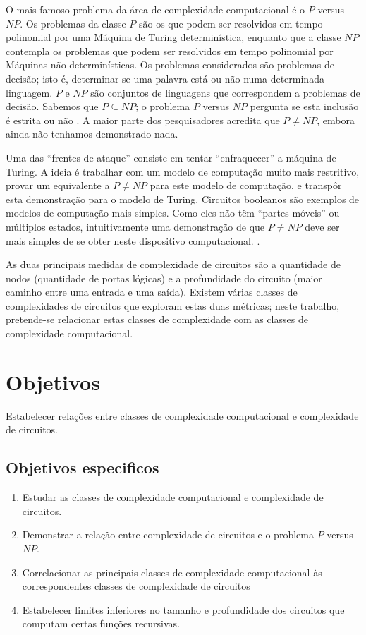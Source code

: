 \documentclass[12pt]{article}
\begin{document}
    O mais famoso problema da área de complexidade computacional é o $P$ versus $NP$.
    Os problemas da classe $P$ são os que podem ser resolvidos em tempo polinomial
    por uma Máquina de Turing determinística, enquanto que a classe $NP$ contempla
    os problemas que podem ser resolvidos em tempo polinomial por Máquinas
    não-determinísticas.
    Os problemas considerados são problemas de decisão; isto é, determinar se uma
    palavra está ou não numa determinada linguagem. $P$ e $NP$ são conjuntos de
    linguagens que correspondem a problemas de decisão. Sabemos que $P \subseteq NP$;
    o problema $P$ versus $NP$ pergunta se esta inclusão é estrita ou não \cite{Sipser2006}.
    A maior parte dos pesquisadores acredita que $P \neq NP$,
    embora ainda não tenhamos demonstrado nada.

    Uma das ``frentes de ataque'' consiste em tentar ``enfraquecer'' a máquina de Turing.
    A ideia é trabalhar com um modelo de computação muito mais restritivo,
    provar um equivalente a $P \neq NP$ para este modelo de computação,
    e transpôr esta demonstração para o modelo de Turing.
    Circuitos booleanos são exemplos de modelos de computação mais simples.
    Como eles não têm ``partes móveis'' ou múltiplos estados,
    intuitivamente uma demonstração de que $P \neq NP$ deve ser
    mais simples de se obter neste dispositivo computacional. \cite{Hastad1987}.

    As duas principais medidas de complexidade de circuitos são a quantidade de
    nodos (quantidade de portas lógicas) e a profundidade do circuito
    (maior caminho entre uma entrada e uma saída).
    Existem várias classes de complexidades de circuitos
    que exploram estas duas métricas;
    neste trabalho, pretende-se relacionar estas classes de complexidade
    com as classes de complexidade computacional.

\section{Objetivos}

    Estabelecer relações entre classes de complexidade computacional
    e complexidade de circuitos.

\subsection{Objetivos especificos}

    \begin{enumerate}
        \item Estudar as classes de complexidade computacional
            e complexidade de circuitos.
        \item Demonstrar a relação entre complexidade de circuitos
            e o problema $P$ versus $NP$.
        \item Correlacionar as principais classes de complexidade computacional
            às correspondentes classes de complexidade de circuitos
        \item Estabelecer limites inferiores no tamanho e profundidade dos circuitos
            que computam certas funções recursivas.
    \end{enumerate}
\end{document}
